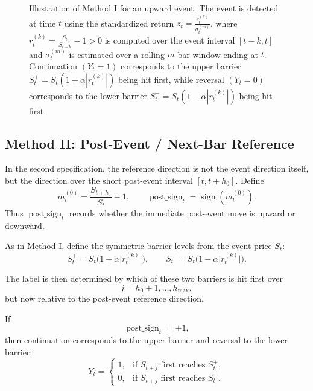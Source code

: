 \documentclass[11pt,a4paper]{article}
\begin{document}
\begin{figure}[H]
	\caption{Illustration of Method I for an upward event. The event is detected at time \(t\) using the standardized return \(z_t=\frac{r_t^{(k)}}{\sigma_t^{(m)}}\), where \(r_t^{(k)}=\frac{S_t}{S_{t-k}}-1 > 0\) is computed over the event interval \([t-k,t]\) and \(\sigma_t^{(m)}\) is estimated over a rolling \(m\)-bar window ending at \(t\). Continuation \((Y_t=1)\) corresponds to the upper barrier \(S_t^{+}=S_t(1+\alpha |r_t^{(k)}|)\) being hit first, while reversal \((Y_t=0)\) corresponds to the lower barrier \(S_t^{-}=S_t(1-\alpha |r_t^{(k)}|)\) being hit first.}
\end{figure}
	
	\subsection{Method II: Post-Event / Next-Bar Reference}
	
	In the second specification, the reference direction is not the event direction itself, but the direction over the short post-event interval \([t,t+h_0]\). Define
	\[
	m_t^{(0)} = \frac{S_{t+h_0}}{S_t}-1,
	\qquad
	\operatorname{post\_sign}_t = \operatorname{sign}\!\left(m_t^{(0)}\right).
	\]
	Thus \(\operatorname{post\_sign}_t\) records whether the immediate post-event move is upward or downward.
	
	As in Method I, define the symmetric barrier levels from the event price \(S_t\):
	\[
	S_t^{+} = S_t\bigl(1+\alpha \lvert r_t^{(k)}\rvert\bigr),
	\qquad
	S_t^{-} = S_t\bigl(1-\alpha \lvert r_t^{(k)}\rvert\bigr).
	\]
	
	The label is then determined by which of these two barriers is hit first over
	\[
	j=h_0+1,\dots,h_{\max},
	\]
	but now relative to the post-event reference direction.
	
	If
	\[
	\operatorname{post\_sign}_t=+1,
	\]
	then continuation corresponds to the upper barrier and reversal to the lower barrier:
	\[
	Y_t =
	\begin{cases}
		1, & \text{if } S_{t+j} \text{ first reaches } S_t^{+},\\[1mm]
		0, & \text{if } S_{t+j} \text{ first reaches } S_t^{-}.
	\end{cases}
	\]
	
\end{document}

